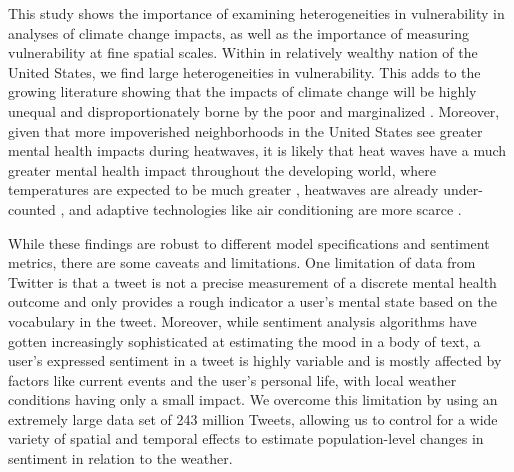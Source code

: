 \documentclass[fleqn,10pt]{wlscirep}
\begin{document}
This study shows the importance of examining heterogeneities in vulnerability in analyses of climate change impacts, as well as the importance of measuring vulnerability at fine spatial scales.  Within in relatively wealthy nation of the United States, we find large heterogeneities in vulnerability.  This adds to the growing literature showing that the impacts of climate change will be highly unequal and disproportionately borne by the poor and marginalized \cite{Thomas2019Mar}.  Moreover, given that more impoverished neighborhoods in the United States see greater mental health impacts during heatwaves, it is likely that heat waves have a much greater mental health impact throughout the developing world, where temperatures are expected to be much greater \cite{Raymond2020May}, heatwaves are already under-counted \cite{Harrington2020Sep}, and adaptive technologies like air conditioning are more scarce \cite{Biardeau2020Jan}.

While these findings are robust to different model specifications and sentiment metrics, there are some caveats and limitations. One limitation of data from Twitter is that a tweet is not a precise measurement of a discrete mental health outcome and only provides a rough indicator a user's mental state based on the vocabulary in the tweet.  Moreover, while sentiment analysis algorithms have gotten increasingly sophisticated at estimating the mood in a body of text, a user's expressed sentiment in a tweet is highly variable and is mostly affected by factors like current events and the user's personal life, with local weather conditions having only a small impact.  We overcome this limitation by using an extremely large data set of 243 million Tweets, allowing us to control for a wide variety of spatial and temporal effects to estimate population-level changes in sentiment in relation to the weather.
\end{document}
